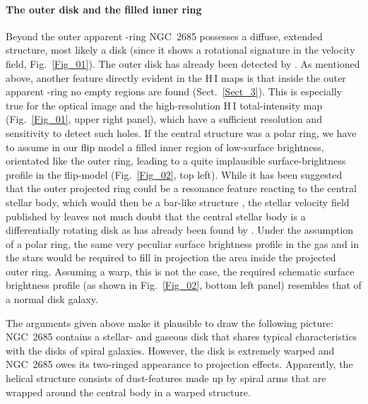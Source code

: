 \documentclass[oldversion]{aa}
\begin{document}
\paragraph{The outer disk and the filled inner ring\\}
Beyond the outer apparent -ring NGC~2685 possesses a diffuse,
extended structure, most likely a disk (since it shows a rotational
signature in the velocity field, Fig.~\ref{Fig_01}).  The outer disk
has already been detected by \citet[][]{Mahon92}. As mentioned above,
another feature directly evident in the {H\,{\small I}} maps is that
inside the outer apparent -ring no empty regions are found
(Sect.~\ref{Sect_3}). This is especially true for the optical image
and the high-resolution {H\,{\small I}} total-intensity map
(Fig.~\ref{Fig_01}, upper right panel), which have a sufficient
resolution and sensitivity to detect such holes. If the central
 structure was a polar ring, we have to assume in our flip
model a filled inner region of low-surface brightness, orientated like
the outer ring, leading to a quite implausible surface-brightness
profile in the flip-model (Fig.~\ref{Fig_02}, top left). While it has
been suggested that the outer projected ring could be a resonance
feature reacting to the central stellar body, which would then be a
bar-like structure \citep[][]{Schinnerer02}, the stellar velocity
field published by \citet[][]{Emsellem04} leaves not much doubt that
the central stellar body is a differentially rotating disk as has
already been found by \citet[][]{Schechter78}. Under the assumption of
a polar ring, the same very peculiar surface brightness profile in the
gas and in the stars would be required to fill in projection the area
inside the projected outer ring. Assuming a warp, this is not the
case, the required schematic surface brightness profile (as shown in
Fig.~\ref{Fig_02}, bottom left panel) resembles that of a normal disk
galaxy.

The arguments given above make it plausible to draw the following
picture: NGC~2685 contains a stellar- and gaseous disk that shares
typical characteristics with the disks of spiral galaxies. However,
the disk is extremely warped and NGC~2685 owes its two-ringed
appearance to projection effects. Apparently, the helical structure
consists of dust-features made up by spiral arms that are wrapped
around the central body in a warped structure.
\end{document}
